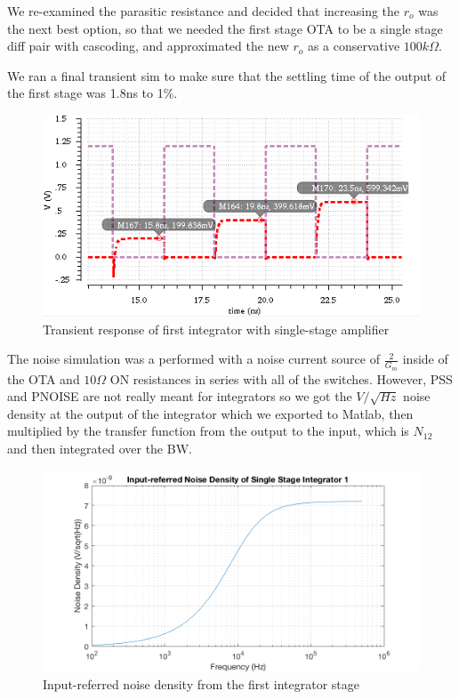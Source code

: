 \documentclass[conference]{IEEEtran}
\begin{document}
We re-examined the parasitic resistance and decided that increasing the $r_o$ was the next best option, so that we needed the first stage OTA to be a single stage diff pair with cascoding, and approximated the new $r_o$ as a conservative $100k\Omega$.

We ran a final transient sim to make sure that the settling time of the output of the first stage was 1.8ns to 1\%. 

\begin{figure}[h]
\centering
\includegraphics[width=\linewidth]{img/stage1-tran}
\caption{Transient response of first integrator with single-stage amplifier}
\label{stage1-tran}
\end{figure}

The noise simulation was a performed with a noise current source of $\frac{2}{G_m}$ inside of the OTA and $10\Omega$ ON resistances in series with all of the switches. However, PSS and PNOISE are not really meant for integrators so we got the $V/\sqrt{Hz}$ noise density at the output of the integrator which we exported to Matlab, then multiplied by the transfer function from the output to the input, which is $N_{12}$ and then integrated over the BW.

\begin{figure}[h]
\centering
\includegraphics[width=\linewidth]{img/noise-stage1}
\caption{Input-referred noise density from the first integrator stage}
\label{noise-stage1}
\end{figure}
\end{document}
